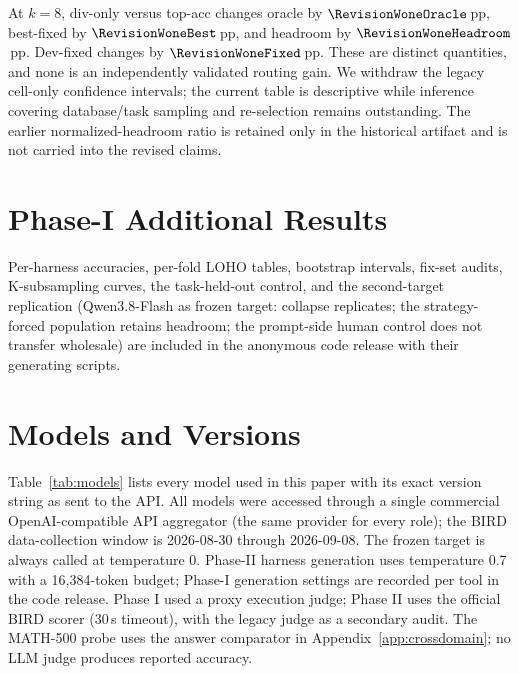 At $k=8$, div-only versus top-acc changes oracle by
$\RevisionWoneOracle$\,pp, best-fixed by $\RevisionWoneBest$\,pp,
and headroom by $\RevisionWoneHeadroom$\,pp. Dev-fixed changes by
$\RevisionWoneFixed$\,pp. These are distinct quantities, and none is an
independently validated routing gain. We withdraw the legacy cell-only
confidence intervals; the current table is descriptive while inference
covering database/task sampling and re-selection remains outstanding.
The earlier normalized-headroom ratio is retained only in the historical
artifact and is not carried into the revised claims.

\begin{table}[t]
\centering\small

\caption{Canonical descriptive W1 reanalysis. Every pool contains $k$
selected candidates plus the common bare. Means over 18 cells and 100
overlapping database splits; no confidence intervals. Dev-fixed is chosen
only on development data; Best uses held-out outcomes.}
\label{tab:selection}
\end{table}

\section{Phase-I Additional Results}\label{app:phase1-results}
Per-harness accuracies, per-fold LOHO tables, bootstrap intervals,
fix-set audits, K-subsampling curves, the task-held-out control, and the
second-target replication (Qwen3.8-Flash as frozen target: collapse
replicates; the strategy-forced population retains headroom; the
prompt-side human control does not transfer wholesale) are included in
the anonymous code release with their generating scripts.

\section{Models and Versions}\label{app:models}

Table~\ref{tab:models} lists every model used in this paper with its exact
version string as sent to the API. All models were accessed through a single
commercial OpenAI-compatible API aggregator (the same provider for every
role); the BIRD data-collection window is 2026-08-30 through 2026-09-08. The frozen
target is always called at temperature 0. Phase-II harness generation uses
temperature 0.7 with a 16{,}384-token budget; Phase-I generation settings are
recorded per tool in the code release. Phase I used a proxy execution judge;
Phase II uses the official BIRD scorer (30\,s timeout), with the legacy
judge as a secondary audit. The MATH-500 probe uses the answer comparator
in Appendix~\ref{app:crossdomain}; no LLM judge produces reported accuracy.

